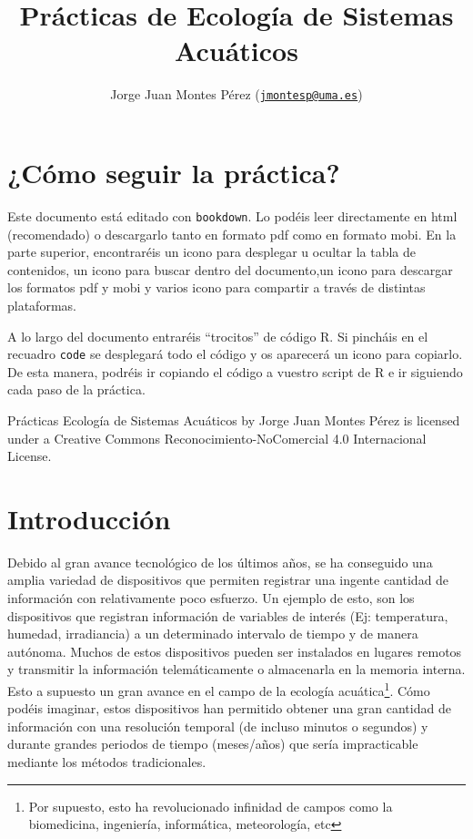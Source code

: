 \documentclass[
]{book}
\title{Prácticas de Ecología de Sistemas Acuáticos}
\author{Jorge Juan Montes Pérez (\href{mailto:jmontesp@uma.es}{\nolinkurl{jmontesp@uma.es}})}
\date{}
\newcommand{\passthrough}[1]{#1}
\begin{document}
\maketitle

{
\setcounter{tocdepth}{1}
\tableofcontents
}
\hypertarget{cuxf3mo-seguir-la-pruxe1ctica}{%
\chapter*{¿Cómo seguir la práctica?}\label{cuxf3mo-seguir-la-pruxe1ctica}}

Este documento está editado con \passthrough{\lstinline!bookdown!}. Lo podéis leer directamente en html (recomendado) o descargarlo tanto en formato pdf como en formato mobi. En la parte superior, encontraréis un icono para desplegar u ocultar la tabla de contenidos, un icono para buscar dentro del documento,un icono para descargar los formatos pdf y mobi y varios icono para compartir a través de distintas plataformas.

A lo largo del documento entraréis ``trocitos'' de código R. Si pincháis en el recuadro \passthrough{\lstinline!code!} se desplegará todo el código y os aparecerá un icono para copiarlo. De esta manera, podréis ir copiando el código a vuestro script de R e ir siguiendo cada paso de la práctica.

{Prácticas Ecología de Sistemas Acuáticos} by {Jorge Juan Montes Pérez} is licensed under a Creative Commons Reconocimiento-NoComercial 4.0 Internacional License.

\hypertarget{introducciuxf3n}{%
\chapter{Introducción}\label{introducciuxf3n}}

Debido al gran avance tecnológico de los últimos años, se ha conseguido una amplia variedad de dispositivos que permiten registrar una ingente cantidad de información con relativamente poco esfuerzo. Un ejemplo de esto, son los dispositivos que registran información de variables de interés (Ej: temperatura, humedad, irradiancia) a un determinado intervalo de tiempo y de manera autónoma. Muchos de estos dispositivos pueden ser instalados en lugares remotos y transmitir la información telemáticamente o almacenarla en la memoria interna. Esto a supuesto un gran avance en el campo de la ecología acuática\footnote{Por supuesto, esto ha revolucionado infinidad de campos como la biomedicina, ingeniería, informática, meteorología, etc}. Cómo podéis imaginar, estos dispositivos han permitido obtener una gran cantidad de información con una resolución temporal (de incluso minutos o segundos) y durante grandes periodos de tiempo (meses/años) que sería impracticable mediante los métodos tradicionales.
\end{document}
